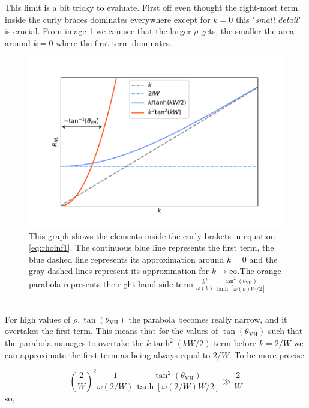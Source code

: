 This limit is a bit tricky to evaluate. First off even thought the right-most term inside the curly braces dominates everywhere except for $k=0$ this "\emph{small detail}" is crucial. From image \ref{fig:rho1} we can see that the larger $\rho$ gets, the smaller the area around $k=0$ where the first term dominates.
\begin{figure}[h!]
    \centering
    \includegraphics[width=\linewidth]{Immagini/rnl/rho1.pdf}
    \caption{This graph shows the elements inside the curly brakets in equation \ref{eq:rhoinf1}. The continuous blue line represents the first term, the blue dashed line represents its approximation around $k=0$ and the gray dashed lines represent its approximation for $k\to \infty$.\newline The orange parabola represents the right-hand side term $\frac {k^2}{\omega(k)}\frac{\tan^2(\theta_{\textrm{VH}})}{\tanh[\omega(k)W/2]}$}
    \label{fig:rho1}
\end{figure}\\
For high values of $\rho, \tan(\theta_{\textrm{VH}})$ the parabola becomes really narrow, and it overtakes the first term. This means that for the values of $\tan(\theta_{\textrm{VH}})$ such that the parabola manages to overtake the $k\tanh^2(kW/2)$ term before $k=2/W$ we can approximate the first term as being always equal to $2/W$. To be more precise

\[
    \left(\frac 2W\right)^2\frac 1{\omega(2/W)}\frac{\tan^2(\theta_{\textrm{VH}})}{\tanh[\omega(2/W)W/2]}\gg \frac 2W
\]
so,

